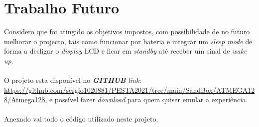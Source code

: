 \section{Trabalho Futuro}
Considero que foi atingido os objetivos impostos, com possibilidade de no futuro melhorar o projecto, tais como funcionar por bateria e integrar um \textit{sleep mode} de forma a desligar o \textit{display} LCD e ficar em \textit{standby} até receber um sinal de \textit{wake up}.
\\
\\
O projeto esta disponível no \textit{\textbf{GITHUB}} \textit{link}: \url{https://github.com/sergio1020881/PESTA2021/tree/main/SandBox/ATMEGA128/Atmega128}, e possível fazer \textit{download} para quem quiser emular a experiência.
\\
\\
Anexado %
vai todo o código utilizado neste projeto.
\begin{comment}
Sensitivity,Long-Term Drift e Temperature Effects (Span temperature hysteresis).
\end{comment}
